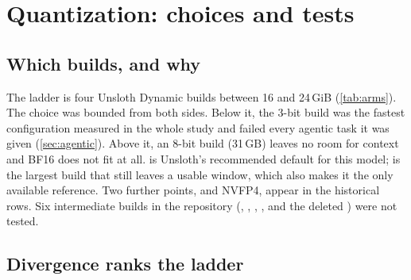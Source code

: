 \section{Quantization: choices and tests}\label{sec:quant}

\subsection{Which builds, and why}
The ladder is four Unsloth Dynamic builds between 16 and 24\,GiB (\cref{tab:arms}). The choice was
bounded from both sides. Below it, the 3-bit build was the fastest configuration measured in the whole
study and failed every agentic task it was given (\cref{sec:agentic}). Above it, an 8-bit build
(31\,GB) leaves no room for context and BF16 does not fit at all. \Qfour{} is Unsloth's recommended
default for this model; \QsixXL{} is the largest build that still leaves a usable window, which also
makes it the only available reference. Two further points, \IQfour{} and NVFP4, appear in the
historical rows. Six intermediate builds in the repository (, ,
, ,  and the deleted ) were not tested.

\subsection{Divergence ranks the ladder}\label{sec:kld}

